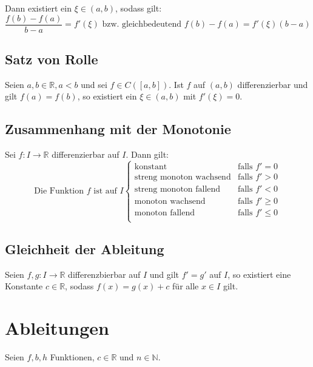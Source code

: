 			Dann existiert ein $ \xi \in (a, b) $, sodass gilt:
			\begin{equation*}
				\frac{f(b) - f(a)}{b - a} = f'(\xi) \text{ bzw. gleichbedeutend } f(b) - f(a) = f'(\xi)(b - a)
			\end{equation*}

		\subsection{Satz von Rolle}
			Seien $ a, b \in \mathbb{R}, a < b $ und sei $ f \in C([a, b]) $. Ist $ f $ auf $ (a, b) $ differenzierbar und gilt $ f(a) = f(b) $, so existiert ein $ \xi \in (a, b) $ mit $ f'(\xi) = 0 $.

		\subsection{Zusammenhang mit der Monotonie}
			Sei $ f : I \rightarrow \mathbb{R} $ differenzierbar auf $ I $. Dann gilt:
			\begin{equation*}
				\text{Die Funktion } f \text{ ist auf } I
				\begin{cases}
					\text{konstant}                & \text{falls } f' = 0    \\
					\text{streng monoton wachsend} & \text{falls } f' > 0    \\
					\text{streng monoton fallend}  & \text{falls } f' < 0    \\
					\text{monoton wachsend}        & \text{falls } f' \geq 0 \\
					\text{monoton fallend}         & \text{falls } f' \leq 0 \\
				\end{cases}
			\end{equation*}

		\subsection{Gleichheit der Ableitung}
			Seien $ f, g : I \rightarrow \mathbb{R} $ differenzbierbar auf $ I $ und gilt $ f' = g' $ auf $ I $, so existiert eine Konstante $ c \in \mathbb{R} $, sodass $ f(x) = g(x) + c $ für alle $ x \in I $ gilt.

	\section{Ableitungen}
		Seien $ f, b, h $ Funktionen, $ c \in \mathbb{R} $ und $ n \in \mathbb{N} $.

